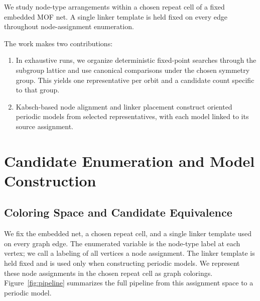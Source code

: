 \documentclass[a5paper, 10pt]{article}
\begin{document}
We study node-type arrangements within a chosen repeat cell of a fixed embedded MOF net. A single linker template is held fixed on every edge throughout node-assignment enumeration.

The work makes two contributions:%
\begin{enumerate}
    \item In exhaustive runs, we organize deterministic fixed-point searches through the subgroup lattice and use canonical comparisons under the chosen symmetry group. This yields one representative per orbit and a candidate count specific to that group.
    \item Kabsch-based node alignment and linker placement construct oriented periodic models from selected representatives, with each model linked to its source assignment.
\end{enumerate}

\clearpage
\section{Candidate Enumeration and Model Construction}



\subsection{Coloring Space and Candidate Equivalence}


\label{sec:theory}
We fix the embedded net, a chosen repeat cell, and a single linker template used on every graph edge. The enumerated variable is the node-type label at each vertex; we call a labeling of all vertices a node assignment. The linker template is held fixed and is used only when constructing periodic models. We represent these node assignments in the chosen repeat cell as graph colorings. Figure~\ref{fig:pipeline} summarizes the full pipeline from this assignment space to a periodic model.
\end{document}

